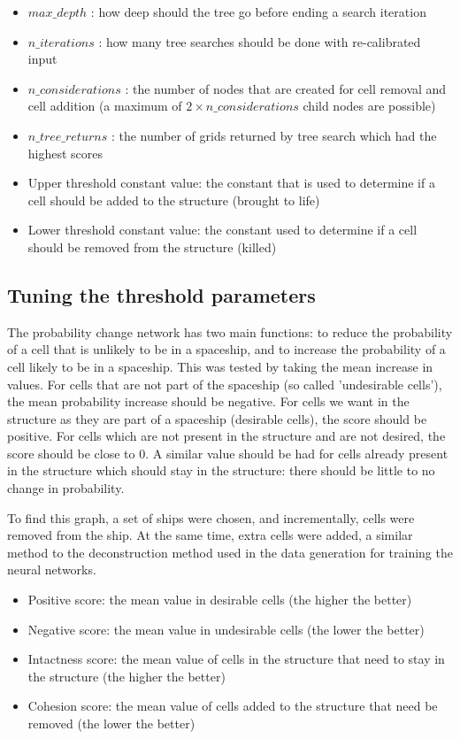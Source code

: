 \documentclass{l4proj}
\begin{document}
\begin{itemize}
    \item $max\_depth$ : how deep should the tree go before ending a search iteration
    \item $n\_iterations$ : how many tree searches should be done with re-calibrated input
    \item $n\_considerations$ : the number of nodes that are created for cell removal and cell addition (a maximum of $2 \times n\_considerations$ child nodes are possible)
    \item $n\_tree\_returns$ : the number of grids returned by tree search which had the highest scores
    \item Upper threshold constant value: the constant that is used to determine if a cell should be added to the structure (brought to life)
    \item Lower threshold constant value: the constant used to determine if a cell should be removed from the structure (killed)
\end{itemize} 

\subsection{Tuning the threshold parameters}

The probability change network has two main functions: to reduce the probability of a cell that is unlikely to be in a spaceship, and to increase the probability of a cell likely to be in a spaceship. This was tested by taking the mean increase in values. For cells that are not part of the spaceship (so called 'undesirable cells'), the mean probability increase should be negative. For cells we want in the structure as they are part of a spaceship (desirable cells), the score should be positive. For cells which are not present in the structure and are not desired, the score should be close to 0. A similar value should be had for cells already present in the structure which should stay in the structure: there should be little to no change in probability. 

To find this graph, a set of ships were chosen, and incrementally, cells were removed from the ship. At the same time, extra cells were added, a similar method to the deconstruction method used in the data generation for training the neural networks.

\begin{itemize}
    \item Positive score: the mean value in desirable cells (the higher the better)
    \item Negative score: the mean value in undesirable cells (the lower the better)
    \item Intactness score: the mean value of cells in the structure that need to stay in the structure (the higher the better)
    \item Cohesion score: the mean value of cells added to the structure that need be removed (the lower the better)
\end{itemize}
\end{document}
